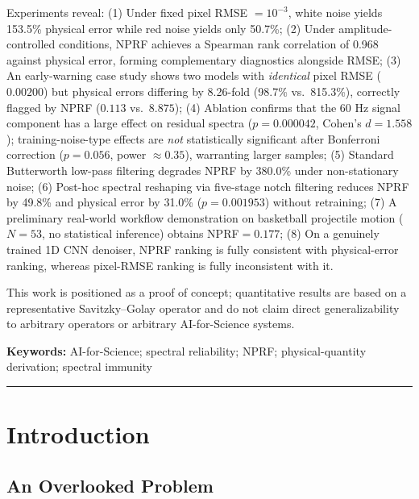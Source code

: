\documentclass[9pt,twocolumn]{article}
\theoremstyle{remark}
\theoremstyle{definition}
\begin{document}
Experiments reveal: (1) Under fixed pixel RMSE $=10^{-3}$, white noise yields 153.5\% physical error while red noise yields only 50.7\%; (2) Under amplitude-controlled conditions, NPRF achieves a Spearman rank correlation of 0.968 against physical error, forming complementary diagnostics alongside RMSE; (3) An early-warning case study shows two models with \textit{identical} pixel RMSE ($0.00200$) but physical errors differing by 8.26-fold (98.7\% vs.\ 815.3\%), correctly flagged by NPRF ($0.113$ vs.\ $8.875$); (4) Ablation confirms that the 60 Hz signal component has a large effect on residual spectra ($p=0.000042$, Cohen's $d=1.558$); training-noise-type effects are \textit{not} statistically significant after Bonferroni correction ($p=0.056$, power $\approx0.35$), warranting larger samples; (5) Standard Butterworth low-pass filtering degrades NPRF by 380.0\% under non-stationary noise; (6) Post-hoc spectral reshaping via five-stage notch filtering reduces NPRF by 49.8\% and physical error by 31.0\% ($p=0.001953$) without retraining; (7) A preliminary real-world workflow demonstration on basketball projectile motion ($N=53$, no statistical inference) obtains NPRF$=0.177$; (8) On a genuinely trained 1D CNN denoiser, NPRF ranking is fully consistent with physical-error ranking, whereas pixel-RMSE ranking is fully inconsistent with it.

This work is positioned as a proof of concept; quantitative results are based on a representative Savitzky--Golay operator and do not claim direct generalizability to arbitrary operators or arbitrary AI-for-Science systems.

\vspace{0.1pt}
\noindent\textbf{Keywords:} AI-for-Science; spectral reliability; NPRF; physical-quantity derivation; spectral immunity

\endgroup

\vspace{0.1pt}
\hrule
\vspace{0.1pt}

\section{Introduction}

\subsection{An Overlooked Problem}
\end{document}
